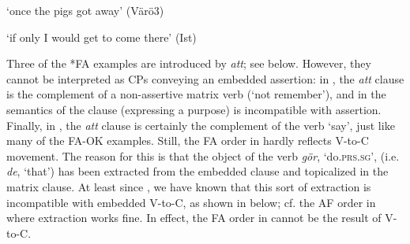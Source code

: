 \documentclass[output=paper,colorlinks,citecolor=brown,draft,draftmode]{langscibook}
\begin{document}
\ea\label{ex:petzell:14}

\glt `once the pigs got away’ (Värö3)

\glt `if only I would get to come there’ (Ist)
\z
\z


Three of the *FA examples are introduced by \textit{att}; see  below. However, they cannot be interpreted as CPs conveying an embedded assertion: in , the \textit{att} clause is the complement of a non-assertive matrix verb (‘not remember’), and in  the semantics of the clause (expressing a purpose) is incompatible with assertion. Finally, in , the \textit{att} clause is certainly the complement of the verb ‘say’, just like many of the FA-OK examples. Still, the FA order in  hardly reflects V-to-C movement. The reason for this is that the object of the verb \textit{gör}, ‘do.\textsc{prs}.\textsc{sg}’, (i.e. \textit{de}, ‘that’) has been extracted from the embedded clause and topicalized in the matrix clause. At least since \citet{Holmberg1986}, we have known that this sort of extraction is incompatible with embedded V-to-C, as shown in  below; cf. the AF order in  where extraction works fine. In effect, the FA order in  cannot be the result of V-to-C.


\ea\label{ex:petzell:15}
\end{document}
